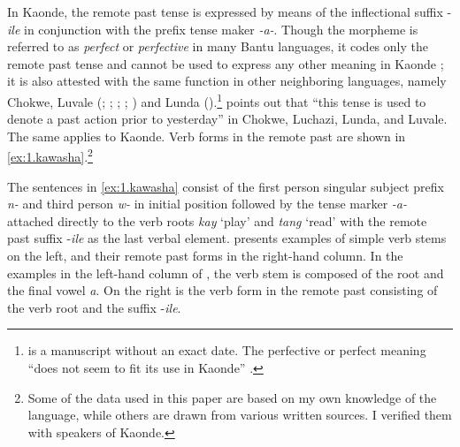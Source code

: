 \documentclass[output=paper]{langsci/langscibook}
\begin{document}
In Kaonde, the remote past tense is expressed by means of the inflectional suffix -\textit{ile} in conjunction with the prefix tense maker \textit{-a-}. Though the morpheme is referred to as \textit{perfect} or \textit{perfective} in many Bantu languages, it codes only the remote past tense and cannot be used to express any other meaning in Kaonde \citep[137]{wright1977}; it is also attested with the same function in other neighboring languages, namely Chokwe, Luvale (\citealt{white1947}; \citeyear{white1949}; \citeyear{white196...}; \citealt{horton1949}; \citealt{yukawa1987}) and Lunda (\citealt{fisher1984,kawasha2003}).\footnote{\citep{white196...} is a manuscript without an exact date. The perfective or perfect meaning “does not seem to fit its use in Kaonde” \citep{wright1977}.} \citet[6]{white1947} points out that “this tense is used to denote a past action prior to yesterday” in Chokwe, Luchazi, Lunda, and Luvale. The same applies to Kaonde. Verb forms in the remote past are shown in \ref{ex:1.kawasha}.\footnote{Some of the data used in this paper are based on my own knowledge of the language, while others are drawn from various written sources. I verified them with speakers of Kaonde.}


\ea
\label{ex:1.kawasha}
	\z

	\z
\z






The sentences in \ref{ex:1.kawasha} consist of the first person singular subject prefix \textit{n-} and third person \textit{w-} in initial position followed by the tense marker \textit{-a-} attached directly to the verb roots \textit{kay} ‘play’ and \textit{tang} ‘read’ with the remote past suffix -\textit{ile} as the last verbal element.  presents examples of simple verb stems on the left, and their remote past forms in the right-hand column. In the examples in the left-hand column of , the verb stem is composed of the root and the final vowel \textit{a}. On the right is the verb form in the remote past consisting of the verb root and the suffix -\textit{ile}.
\end{document}
